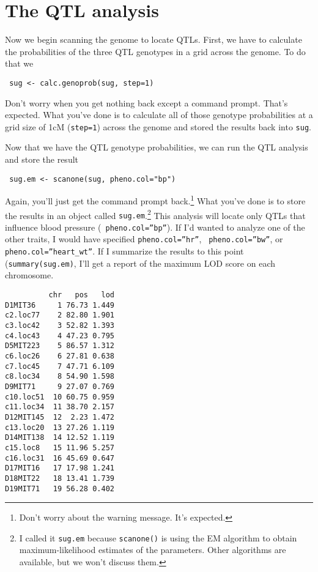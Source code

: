 \section*{The QTL analysis}

Now we begin scanning the genome to locate QTLs. First, we have to
calculate the probabilities of the three QTL genotypes in a grid
across the genome. To do that we
\begin{verbatim}
 sug <- calc.genoprob(sug, step=1)
\end{verbatim}
Don't worry when you get nothing back except a command prompt. That's
expected. What you've done is to calculate all of those genotype
probabilities at a grid size of 1cM ({\tt step=1}) across the genome
and stored the results back into {\tt sug}.

Now that we have the QTL genotype probabilities, we can run the QTL
analysis and store the result
\begin{verbatim}
 sug.em <- scanone(sug, pheno.col="bp")
\end{verbatim}
Again, you'll just get the command prompt back.\footnote{Don't worry
  about the warning message. It's expected.}  What you've done is to
store the results in an object called {\tt sug.em}.\footnote{I called
  it {\tt sug.em} because {\tt scanone()} is using the EM algorithm to
  obtain maximum-likelihood estimates of the parameters. Other
  algorithms are available, but we won't discuss them.} This analysis
will locate only QTLs that influence blood pressure ({\tt
  pheno.col=''bp''}). If I'd wanted to analyze one of the other
traits, I would have specified {\tt pheno.col=''hr''}, {\tt
  pheno.col=''bw''}, or {\tt pheno.col=''heart\_wt''}. If I summarize
the results to this point ({\tt summary(sug.em)}, I'll get a report of
the maximum LOD score on each chromosome.
\begin{verbatim}
          chr   pos   lod
D1MIT36     1 76.73 1.449
c2.loc77    2 82.80 1.901
c3.loc42    3 52.82 1.393
c4.loc43    4 47.23 0.795
D5MIT223    5 86.57 1.312
c6.loc26    6 27.81 0.638
c7.loc45    7 47.71 6.109
c8.loc34    8 54.90 1.598
D9MIT71     9 27.07 0.769
c10.loc51  10 60.75 0.959
c11.loc34  11 38.70 2.157
D12MIT145  12  2.23 1.472
c13.loc20  13 27.26 1.119
D14MIT138  14 12.52 1.119
c15.loc8   15 11.96 5.257
c16.loc31  16 45.69 0.647
D17MIT16   17 17.98 1.241
D18MIT22   18 13.41 1.739
D19MIT71   19 56.28 0.402
\end{verbatim}

